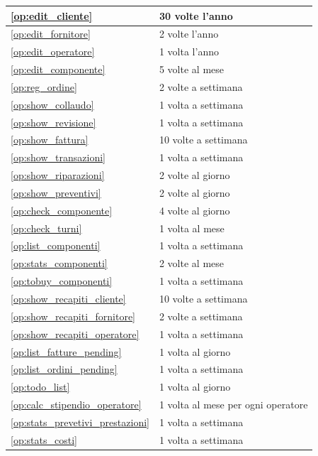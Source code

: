 \begin{longtable}{| p{6.2cm} | p{6.2cm} |}
				\ref{op:edit_cliente} & 30 volte l'anno \\ \hline
				\ref{op:edit_fornitore} & 2 volte l'anno \\ \hline
				\ref{op:edit_operatore} & 1 volta l'anno \\ \hline
				\ref{op:edit_componente} & 5 volte al mese \\ \hline
				\ref{op:reg_ordine} & 2 volte a settimana \\ \hline

				\ref{op:show_collaudo} & 1 volta a settimana \\ \hline
				\ref{op:show_revisione} & 1 volta a settimana \\ \hline
				\ref{op:show_fattura} & 10 volte a settimana \\ \hline
				\ref{op:show_transazioni} & 1 volta a settimana \\ \hline
				\ref{op:show_riparazioni} & 2 volte al giorno \\ \hline
				\ref{op:show_preventivi} & 2 volte al giorno \\ \hline
				\ref{op:check_componente} & 4 volte al giorno \\ \hline
				\ref{op:check_turni} & 1 volta al mese \\ \hline
				\ref{op:list_componenti} & 1 volta a settimana \\ \hline
				\ref{op:stats_componenti} & 2 volte al mese \\ \hline
				\ref{op:tobuy_componenti} & 1 volta a settimana \\ \hline
				\ref{op:show_recapiti_cliente} & 10 volte a settimana \\ \hline
				\ref{op:show_recapiti_fornitore} & 2 volte a settimana \\ \hline
				\ref{op:show_recapiti_operatore} & 1 volta a settimana \\ \hline
				\ref{op:list_fatture_pending} & 1 volta al giorno \\ \hline
				\ref{op:list_ordini_pending} & 1 volta a settimana \\ \hline
				\ref{op:todo_list} & 1 volta al giorno \\ \hline
				\ref{op:calc_stipendio_operatore} & 1 volta al mese per ogni operatore \\\hline
				\ref{op:stats_prevetivi_prestazioni} & 1 volta a settimana \\ \hline
				\ref{op:stats_costi} & 1 volta a settimana \\ \hline

			\end{longtable}
			
